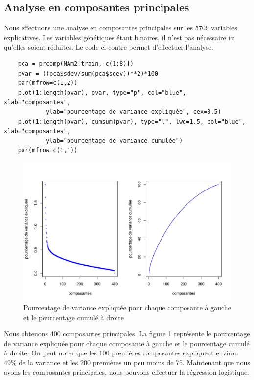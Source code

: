 \documentclass[12pt,a4paper]{article}
\begin{document}
\subsection{Analyse en composantes principales}
Nous effectuons une analyse en composantes principales sur les 5709 variables explicatives. Les variables génétiques étant binaires, il n'est pas nécessaire ici qu'elles soient réduites. Le code ci-contre permet d'effectuer l'analyse.
\begin{lstlisting}
	pca = prcomp(NAm2[train,-c(1:8)])
	pvar = ((pca$sdev/sum(pca$sdev))**2)*100
	par(mfrow=c(1,2))
	plot(1:length(pvar), pvar, type="p", col="blue", xlab="composantes",
			ylab="pourcentage de variance expliquée", cex=0.5)
	plot(1:length(pvar), cumsum(pvar), type="l", lwd=1.5, col="blue", xlab="composantes",
			ylab="pourcentage de variance cumulée")
	par(mfrow=c(1,1))
\end{lstlisting}
\begin{figure}[h!]
	\begin{center}
		\includegraphics[scale=0.7]{figures/pca_plot.pdf}
		\caption{Pourcentage de variance expliquée pour chaque composante à gauche et le pourcentage cumulé à droite}
		\label{fig:acp_plot}
	\end{center}
\end{figure}
Nous obtenons 400 composantes principales. La figure \ref{fig:acp_plot} représente le pourcentage de variance expliquée pour chaque composante à gauche et le pourcentage cumulé à droite. On peut noter que les 100 premières composantes expliquent environ 49\% de la variance et les 200 premières un peu moins de 75.
Maintenant que nous avons les composantes principales, nous pouvons effectuer la régression logistique.
\end{document}
